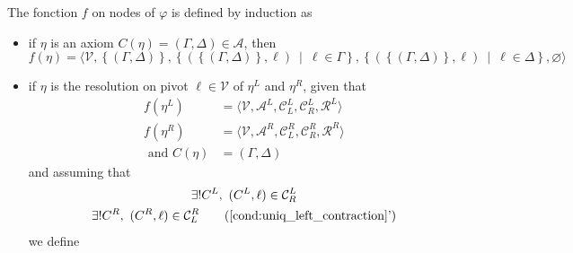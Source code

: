 \documentclass{article}
\newcommand{\ens}[2]{\left\{ #1 ~ \middle| ~ #2 \right\}}
\newcommand{\varSet}{\mathcal{V}}
\newcommand{\axiomSet}{\mathcal{A}}
\newcommand{\conSet}{\mathcal{C}}
\newcommand{\resoSet}{\mathcal{R}}
\newcommand{\Proof}{\varphi}
\newcommand{\node}{\eta}
\newcommand{\pConclusion}[1]{C\left(#1\right)} %
\begin{document}
The fonction $f$ on nodes of $\Proof$ is defined by induction as \begin{itemize}
  \item if $\node$ is an axiom $\pConclusion{\node} = (\Gamma, \Delta) \in \axiomSet$, then
    $$f(\node) = \langle \varSet, \left\{ (\Gamma, \Delta) \right\},
                        \ens{\left(\left\{(\Gamma, \Delta)\right\}, \ell\right)}{\ell \in \Gamma},
                        \ens{\left(\left\{(\Gamma, \Delta)\right\}, \ell\right)}{\ell \in \Delta},
                        \varnothing \rangle$$
  \item if $\node$ is the resolution on pivot $\ell \in \varSet$ of $\node^L$ and $\node^R$, given
  that
  \begin{align*}
    f(\node^L) &= \langle \varSet, \axiomSet^L, \conSet_L^L, \conSet_R^L, \resoSet^L \rangle \\
    f(\node^R) &= \langle \varSet, \axiomSet^R, \conSet_L^R, \conSet_R^R, \resoSet^R \rangle \\
    \text{ and }
    \pConclusion{\node} &= (\Gamma, \Delta)
  \end{align*}
  and assuming that
  \begin{gather}
    \exists! C^L ,~ (C^L,\ell) \in \conSet_R^L \label{cond:uniq_left_contraction} \\
    \exists! C^R ,~ (C^R,\ell) \in \conSet_L^R \tag{\ref{cond:uniq_left_contraction}'}
  \end{gather}
  we define
\end{itemize}
\end{document}
